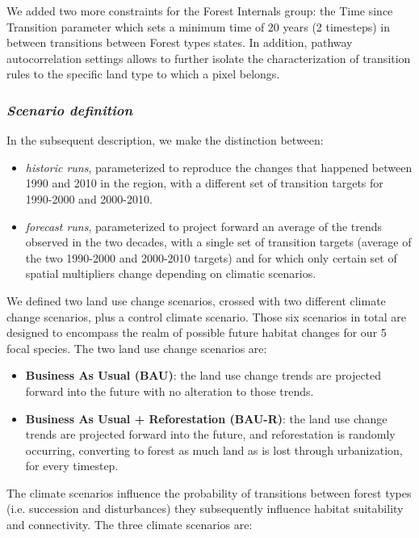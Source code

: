 We added two more constraints for the Forest Internals group: the Time since Transition parameter which sets a minimum time of 20 years (2 timesteps) in between transitions between Forest  types states. In addition, pathway autocorrelation settings allows to further isolate the characterization of transition rules to the specific land type to which a pixel belongs.\\

\subsubsection*{\textit{Scenario definition}}

In the subsequent description, we make the distinction between:
\begin{itemize}
\item{\textit{historic runs}}, parameterized to reproduce the changes that happened between 1990 and 2010 in the region, with a different set of transition targets for 1990-2000 and 2000-2010.
\item{\textit{forecast runs}}, parameterized to project forward an average of the trends observed in the two decades, with a single set of transition targets (average of the two 1990-2000 and 2000-2010 targets) and for which only certain set of spatial multipliers change depending on climatic scenarios.
\end{itemize}
We defined two land use change scenarios, crossed with two different climate change scenarios, plus a control climate scenario. Those six scenarios in total are designed to  encompass the realm of possible future habitat changes for our 5 focal species.
The two land use change scenarios are:
\begin{itemize}
\item{\textbf{Business As Usual (BAU)}}: the land use change trends are projected forward into the future with no alteration to those trends.
\item {\textbf{Business As Usual + Reforestation (BAU-R)}}: the land use change trends are projected forward into the future, and reforestation is randomly occurring, converting to forest as much land as is lost through urbanization, for every timestep.
\end{itemize}
The climate scenarios influence the probability of transitions between forest types (i.e. succession and disturbances) they subsequently influence habitat suitability and connectivity. The three climate scenarios are:
